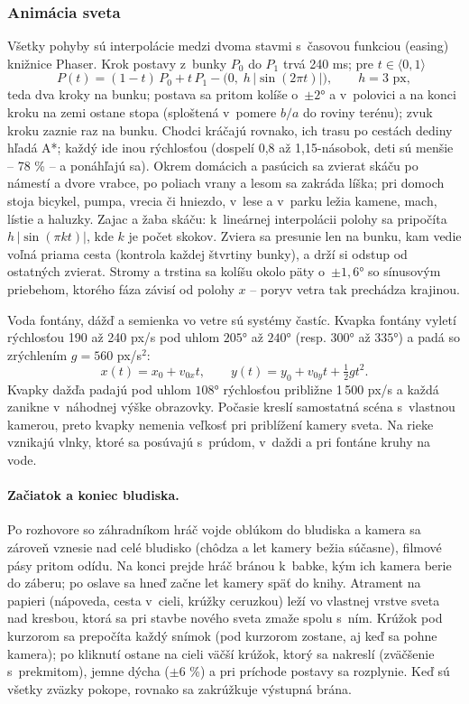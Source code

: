 \documentclass[11pt, a4paper]{article}
\begin{document}
\subsubsection{Animácia sveta}

Všetky pohyby sú interpolácie medzi dvoma stavmi s~časovou funkciou (easing) knižnice Phaser.
Krok postavy z~bunky $P_0$ do $P_1$ trvá 240 ms; pre $t \in \langle 0, 1\rangle$
\begin{equation}
  P(t) = (1 - t)\,P_0 + t\,P_1 - \bigl(0,\; h\,|\sin(2\pi t)|\bigr), \qquad h = 3 \text{ px},
\end{equation}
teda dva kroky na bunku; postava sa pritom kolíše o~$\pm 2°$ a v~polovici a na konci kroku
na zemi ostane stopa (sploštená v~pomere $b/a$ do roviny terénu); zvuk kroku zaznie raz
na bunku. Chodci kráčajú
rovnako, ich trasu po cestách dediny hľadá A*; každý ide inou rýchlosťou (dospelí 0,8 až
1,15-násobok, deti sú menšie – 78 \% – a ponáhľajú sa). Okrem domácich a pasúcich sa zvierat
skáču po námestí a dvore vrabce, po poliach vrany a lesom sa zakráda líška; pri domoch stoja
bicykel, pumpa, vrecia či hniezdo, v~lese a v~parku ležia kamene, mach, lístie a haluzky. Zajac a žaba skáču: k~lineárnej interpolácii
polohy sa pripočíta $h\,|\sin(\pi k t)|$, kde $k$ je počet skokov. Zviera sa presunie len na
bunku, kam vedie voľná priama cesta (kontrola každej štvrtiny bunky), a drží si odstup od
ostatných zvierat. Stromy a trstina sa kolíšu okolo päty o~$\pm 1{,}6°$ so sínusovým priebehom,
ktorého fáza závisí od polohy $x$ – poryv vetra tak prechádza krajinou.

Voda fontány, dážď a semienka vo vetre sú systémy častíc. Kvapka fontány vyletí rýchlosťou
190 až 240 px/s pod uhlom $205°$ až $240°$ (resp. $300°$ až $335°$) a padá so zrýchlením
$g = 560$ px/s$^2$:
\begin{equation}
  x(t) = x_0 + v_{0x} t, \qquad y(t) = y_0 + v_{0y} t + \tfrac{1}{2} g t^2.
\end{equation}
Kvapky dažďa padajú pod uhlom $108°$ rýchlosťou približne 1\,500 px/s a každá zanikne v~náhodnej
výške obrazovky. Počasie kreslí samostatná scéna  s~vlastnou kamerou, preto
kvapky nemenia veľkosť pri priblížení kamery sveta. Na rieke vznikajú vlnky, ktoré sa posúvajú
s~prúdom, v~daždi a pri fontáne kruhy na vode.

\paragraph{Začiatok a koniec bludiska.} Po rozhovore so záhradníkom hráč vojde oblúkom do
bludiska a kamera sa zároveň vznesie nad celé bludisko (chôdza a let kamery bežia súčasne),
filmové pásy pritom odídu. Na konci prejde hráč bránou k~babke, kým ich kamera berie do záberu;
po oslave sa hneď začne let kamery späť do knihy. Atrament na papieri (nápoveda, cesta v~cieli,
krúžky ceruzkou) leží vo vlastnej vrstve sveta nad kresbou, ktorá sa pri stavbe nového sveta
zmaže spolu s~ním. Krúžok pod kurzorom sa prepočíta každý snímok (pod kurzorom zostane, aj keď
sa pohne kamera); po kliknutí ostane na cieli väčší krúžok, ktorý sa nakreslí (zväčšenie
s~prekmitom), jemne dýcha ($\pm 6$ \%) a pri príchode postavy sa rozplynie. Keď sú všetky
zväzky pokope, rovnako sa zakrúžkuje výstupná brána.
\end{document}
